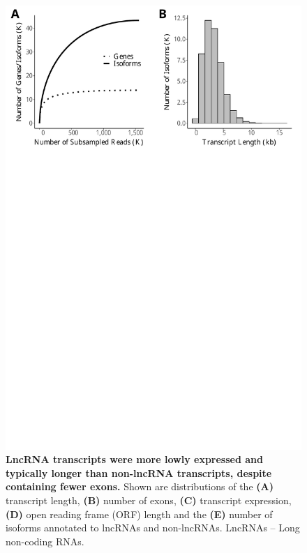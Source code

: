 \begin{figure}[htp]
	\begin{center}
		\includegraphics[page=7,trim={0 1cm 0 0},scale = 0.55]{Figures/IsoSeqWholeTranscriptome.pdf}
	\end{center}
	\captionsetup{width=0.95\textwidth}
	\caption[Characterisation of LncRNAs in the mouse cortex]%
	{\textbf{LncRNA transcripts were more lowly expressed and typically longer than non-lncRNA transcripts, despite containing fewer exons.} Shown are distributions of the \textbf{(A)} transcript length, \textbf{(B)} number of exons, \textbf{(C)} transcript expression, \textbf{(D)} open reading frame (ORF) length and the \textbf{(E)} number of isoforms annotated to lncRNAs and non-lncRNAs. LncRNAs – Long non-coding RNAs.}
	\label{fig:isoseq_whole_lncRNA}
\end{figure}

